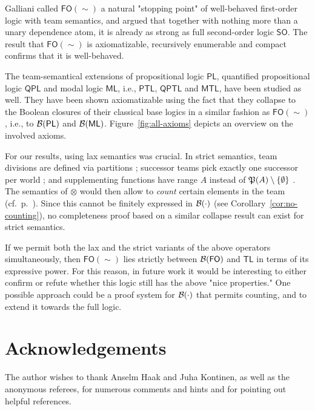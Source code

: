 \documentclass[a4paper,english,fleqn,11pt,final]{scrartcl}
\makeatletter
\newcommand{\ie}{i.e.\@\xspace}
\newcommand{\pow}[1]{{\protect\ensuremath{\mathord{\mathfrak{P}(\nobreak#1\nobreak)}}}}
\newcommand{\negg}{{\sim}}
\newcommand{\logic}[1]{\ensuremath{\mathsf{#1}}\xspace}
\newcommand{\PL}{\logic{PL}}
\newcommand{\QPL}{\logic{QPL}}
\newcommand{\ML}{\logic{ML}}
\newcommand{\FO}{\logic{FO}}
\newcommand{\SO}{\logic{SO}}
\newcommand{\PTL}{\logic{PTL}}
\newcommand{\QPTL}{\logic{QPTL}}
\newcommand{\MTL}{\logic{MTL}}
\newcommand{\TL}{\logic{TL}}
\newcommand{\calB}{\protect\ensuremath{\mathcal{B}}}
\newcommand{\tens}{\otimes}
\theoremstyle{plain}
\theoremstyle{definition}
\makeatother
\begin{document}
Galliani \cite{Galliani14} called $\FO(\negg)$ a natural "stopping point" of well-behaved first-order logic with team semantics, and argued that together with nothing more than a unary dependence atom, it is already as strong as full second-order logic $\SO$.
The result that $\FO(\negg)$ is axiomatizable, recursively enumerable and compact confirms that it is well-behaved.

The team-semantical extensions of propositional logic $\PL$, quantified propositional logic $\QPL$ and modal logic $\ML$, \ie, $\PTL$, $\QPTL$ and $\MTL$, have been studied as well. They have been shown axiomatizable using the fact that they collapse to the Boolean closures of their classical base logics in a similar fashion as $\FO(\negg)$, \ie, to $\calB(\PL)$ and $\calB(\ML)$.
Figure~\ref{fig:all-axioms} depicts an overview on the involved axioms.

\smallskip


For our results, using lax semantics was crucial.
In strict semantics, team divisions are defined via partitions \cite{galliani_inclusion_2012}; successor teams pick exactly one successor per world \cite{minc}; and supplementing functions have range $A$ instead of $\pow{A} \setminus \{\emptyset\}$ \cite{galliani_inclusion_2012,vaananen_dependence_2007}.
The semantics of $\tens$ would then allow to \emph{count} certain elements in the team (cf.\ p.~\pageref{p:count}).
Since this cannot be finitely expressed in $\calB(\cdot)$ (see Corollary~\ref{cor:no-counting}), no completeness proof based on a similar collapse result can exist for strict semantics.

If we permit both the lax and the strict variants of the above operators simultaneously, then $\FO(\negg)$ lies strictly between $\calB(\FO)$ and $\TL$ in terms of its expressive power.
For this reason, in future work it would be interesting to either confirm or refute whether this logic still has the above "nice properties."
One possible approach could be a proof system for $\calB(\cdot)$ that permits counting, and to extend it towards the full logic.

\section*{Acknowledgements}

The author wishes to thank Anselm Haak and Juha Kontinen, as well as the anonymous referees, for numerous comments and hints and for pointing out helpful references.
 
\end{document}
